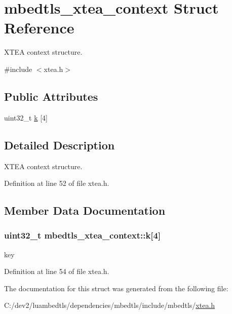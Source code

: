 \hypertarget{structmbedtls__xtea__context}{\section{mbedtls\-\_\-xtea\-\_\-context Struct Reference}
\label{structmbedtls__xtea__context}
}


X\-T\-E\-A context structure.  




{\ttfamily \#include $<$xtea.\-h$>$}

\subsection*{Public Attributes}
\begin{DoxyCompactItemize}
\item 
uint32\-\_\-t \hyperlink{structmbedtls__xtea__context_a3deb125da7fe64c36a22030bf19af98f}{k} \mbox{[}4\mbox{]}
\end{DoxyCompactItemize}


\subsection{Detailed Description}
X\-T\-E\-A context structure. 

Definition at line 52 of file xtea.\-h.



\subsection{Member Data Documentation}
\hypertarget{structmbedtls__xtea__context_a3deb125da7fe64c36a22030bf19af98f}{
\subsubsection[{k}]{\setlength{\rightskip}{0pt plus 5cm}uint32\-\_\-t mbedtls\-\_\-xtea\-\_\-context\-::k\mbox{[}4\mbox{]}}}\label{structmbedtls__xtea__context_a3deb125da7fe64c36a22030bf19af98f}
key 

Definition at line 54 of file xtea.\-h.



The documentation for this struct was generated from the following file\-:\begin{DoxyCompactItemize}
\item 
C\-:/dev2/luambedtls/dependencies/mbedtls/include/mbedtls/\hyperlink{xtea_8h}{xtea.\-h}\end{DoxyCompactItemize}
